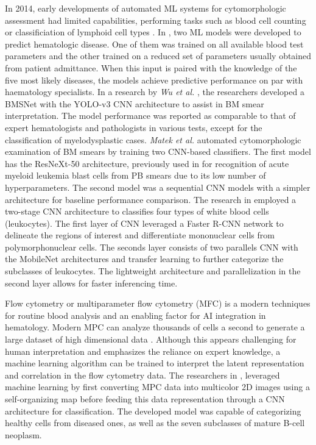 \documentclass[a4paper]{article}
\begin{document}
In 2014, early developments of automated ML systems for cytomorphologic assessment had limited capabilities, performing tasks such as blood cell counting or classificiation of lymphoid cell types \cite{alomari_automatic_2014,alferez_automatic_2014,alferez_automatic_2015}.
In \cite{guncar_application_2018}, two ML models were developed to predict hematologic disease.
One of them was trained on all available blood test parameters and the other trained on a reduced set of parameters usually obtained from patient admittance.
When this input is paired with the knowledge of the five most likely diseases, the models achieve predictive performance on par with haematology specialists.
In a research by \textit{Wu et al.} \cite{wu_hematologist-level_2020}, the researchers developed a BMSNet with the YOLO-v3 CNN architecture to assist in BM smear interpretation.
The model performance was reported as comparable to that of expert hematologists and pathologists in various tests, except for the classification of myelodysplastic cases.
\textit{Matek et al.} \cite{matek_highly_2021} automated cytomorphologic examination of BM smears by training two CNN-based classifiers. 
The first model has the ResNeXt-50 architecture, previously used in \cite{matek_human-level_2019} for recognition of acute myeloid leukemia blast cells from PB smears due to its low number of hyperparameters.
The second model was a sequential CNN models with a simpler architecture for baseline performance comparison.
The research in \cite{cheuque_efficient_2022} employed a two-stage CNN architecture to classifies four types of white blood cells (leukocytes).
The first layer of CNN leveraged a Faster R-CNN network to delineate the regions of interest and differentiate mononuclear cells from polymorphonuclear cells. 
The seconds layer consists of two parallels CNN with the MobileNet architectures and transfer learning to further categorize the subclasses of leukocytes. 
The lightweight architecture and parallelization in the second layer allows for faster inferencing time.

Flow cytometry or multiparameter flow cytometry (MFC) is a modern techniques for routine blood analysis and an enabling factor for AI integration in hematology.
Modern MPC can analyze thousands of cells a second to generate a large dataset of high dimensional data \cite{walter_artificial_2023}. 
Although this appears challenging for human interpretation and emphasizes the reliance on expert knowledge, a machine learning algorithm can be trained to interpret the latent representation and correlation in the flow cytometry data.
The researchers in \cite{zhao_hematologist-level_2020}, leveraged machine learning by first converting MPC data into multicolor 2D images using a self-organizing map before feeding this data representation through a CNN architecture for classification.
The developed model was capable of categorizing healthy cells from diseased ones, as well as the seven subclasses of mature B-cell neoplasm.
\end{document}
